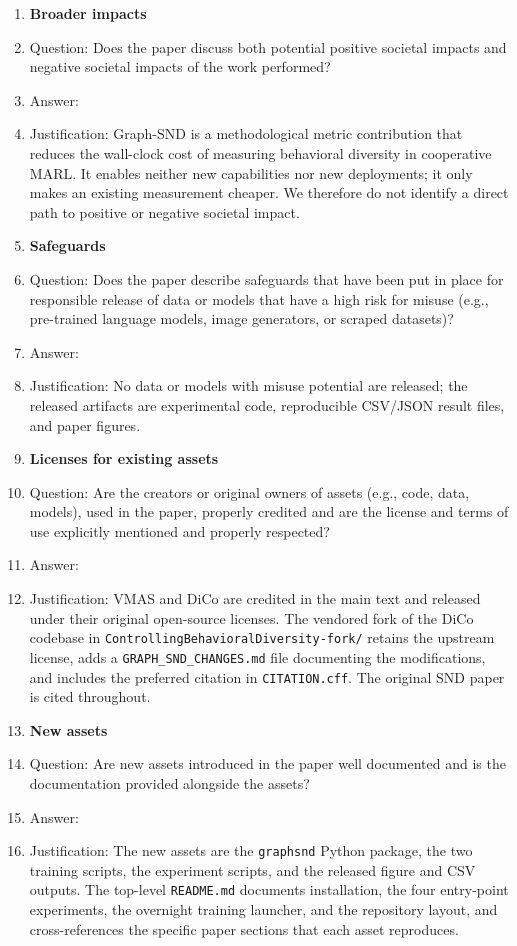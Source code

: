 \begin{enumerate}
\item {\bf Broader impacts}
    \item[] Question: Does the paper discuss both potential positive societal impacts and negative societal impacts of the work performed?
    \item[] Answer: \answerNA{}
    \item[] Justification: Graph-SND is a methodological metric
    contribution that reduces the wall-clock cost of measuring
    behavioral diversity in cooperative MARL. It enables neither
    new capabilities nor new deployments; it only makes an existing
    measurement cheaper. We therefore do not identify a direct path
    to positive or negative societal impact.

\item {\bf Safeguards}
    \item[] Question: Does the paper describe safeguards that have been put in place for responsible release of data or models that have a high risk for misuse (e.g., pre-trained language models, image generators, or scraped datasets)?
    \item[] Answer: \answerNA{}
    \item[] Justification: No data or models with misuse potential
    are released; the released artifacts are experimental code,
    reproducible CSV/JSON result files, and paper figures.

\item {\bf Licenses for existing assets}
    \item[] Question: Are the creators or original owners of assets (e.g., code, data, models), used in the paper, properly credited and are the license and terms of use explicitly mentioned and properly respected?
    \item[] Answer: \answerYes{}
    \item[] Justification: VMAS \citep{bettini2022vmas} and DiCo
    \citep{bettini2024dico} are credited in the main text and
    released under their original open-source licenses. The vendored
    fork of the DiCo codebase in
    \texttt{ControllingBehavioralDiversity-fork/} retains the
    upstream license, adds a \texttt{GRAPH\_SND\_CHANGES.md} file
    documenting the modifications, and includes the preferred
    citation in \texttt{CITATION.cff}. The original SND paper
    \citep{bettini2025snd} is cited throughout.

\item {\bf New assets}
    \item[] Question: Are new assets introduced in the paper well documented and is the documentation provided alongside the assets?
    \item[] Answer: \answerYes{}
    \item[] Justification: The new assets are the \texttt{graphsnd}
    Python package, the two training scripts, the experiment
    scripts, and the released figure and CSV outputs. The top-level
    \texttt{README.md} documents installation, the four entry-point
    experiments, the overnight training launcher, and the repository
    layout, and cross-references the specific paper sections that
    each asset reproduces.


\end{enumerate}
